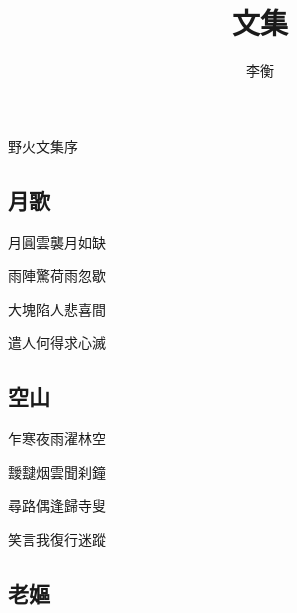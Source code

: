 \documentclass[a4j,12pt]{ltjtarticle}
\title{文集}
\author{李衡}
\begin{document}
	

	
	
	

	\Huge 野火文集序 \\
		
	\newpage
		
	\tableofcontents
	
	\newpage
	\begin{center}
	
		\begin{flushleft}
			\section{月歌} 
		\end{flushleft}
		
		
		
		\vfill
		\LARGE 	月圓雲襲月如缺 \par
		 		雨陣驚荷雨忽歇 \par
		 		大塊陷人悲喜間 \par
		 		遣人何得求心滅 \par
		\vspace{1cm} %
		\vfill
		
	\newpage
		\begin{flushleft}
			\section{空山}
		\end{flushleft}
		
		\vfill
		\LARGE 	乍寒夜雨濯林空 \par
				靉靆烟雲聞刹鐘 \par
				尋路偶逢歸寺叟 \par
				笑言我復行迷蹤 \par
		\vspace{0.5cm} %
		\vfill
		
		
	\newpage
	
		\begin{flushleft}
			\section{老嫗} 
		\end{flushleft}
		

\end{center}
\end{document}
